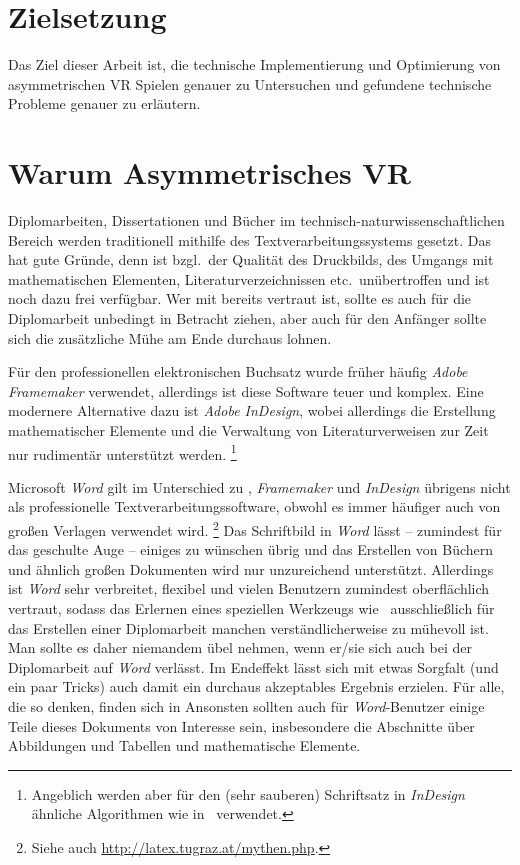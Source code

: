 \section{Zielsetzung}
Das Ziel dieser Arbeit ist, die technische Implementierung und Optimierung von asymmetrischen VR Spielen genauer zu Untersuchen und gefundene technische Probleme genauer zu erläutern.


\section{Warum Asymmetrisches VR}

Diplomarbeiten, Dissertationen und Bücher im
technisch-natur\-wissen\-schaft\-lichen Bereich werden
traditionell mithilfe des Textverarbeitungssystems \latex
\cite{Lamport94,Lamport95} gesetzt. Das hat gute Gründe, denn
\latex ist bzgl.\ der Qualität des Druckbilds, des Umgangs mit
mathematischen Elementen, Literaturverzeichnissen etc.\
unübertroffen und ist noch dazu frei verfügbar. Wer mit \latex
bereits vertraut ist, sollte es auch für die Diplomarbeit
unbedingt in Betracht ziehen, aber auch für den Anfänger sollte
sich die zusätzliche Mühe am Ende durchaus lohnen.

Für den professionellen elektronischen Buchsatz wurde früher
häufig \emph{Adobe Framemaker} verwendet, allerdings ist diese
Software teuer und komplex. Eine modernere Alternative dazu ist
\emph{Adobe InDesign}, wobei allerdings die Erstellung
mathematischer Elemente und die Verwaltung von Literaturverweisen
zur Zeit nur rudimentär unterstützt werden.%
\footnote{Angeblich werden aber für den (sehr sauberen) Schriftsatz 
in \emph{InDesign} ähnliche Algorithmen wie in \latex\ verwendet.}

Microsoft \emph{Word} gilt im Unterschied zu \latex, 
\emph{Framemaker} und \emph{InDesign} übrigens nicht als professionelle
Textverarbeitungssoftware, obwohl es immer häufiger auch von
großen Verlagen verwendet wird.%
\footnote{Siehe auch \url{http://latex.tugraz.at/mythen.php}.}
Das Schriftbild in \emph{Word}
lässt -- zumindest für das geschulte Auge -- einiges zu wünschen
übrig und das Erstellen von Büchern und ähnlich großen Dokumenten
wird nur unzureichend unterstützt. Allerdings ist \emph{Word} sehr
verbreitet, flexibel und vielen Benutzern zumindest oberflächlich
vertraut, sodass das Erlernen eines speziellen Werkzeugs wie
\latex\ ausschließlich für das Erstellen einer Diplomarbeit
manchen verständlicherweise zu mühevoll ist. Man sollte es daher
niemandem übel nehmen, wenn er/sie sich auch bei der Diplomarbeit
auf \emph{Word} verlässt. Im Endeffekt lässt sich mit etwas
Sorgfalt (und ein paar Tricks) auch damit ein durchaus akzeptables
Ergebnis erzielen. 
Für alle, die so denken, finden sich in
Ansonsten sollten auch für \emph{Word}-Benutzer 
einige Teile dieses Dokuments von Interesse sein, insbesondere die
Abschnitte über Abbildungen und Tabellen und mathematische Elemente.

